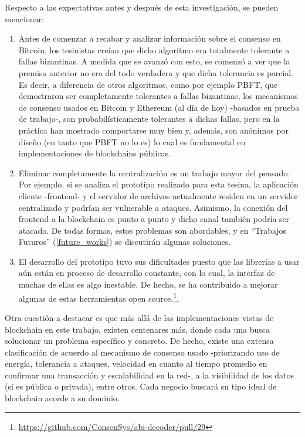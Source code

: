 Respecto a las expectativas antes y después de esta investigación, se pueden mencionar:

\begin{enumerate}
  \item Antes de comenzar a recabar y analizar información sobre el consenso en Bitcoin, los tesinistas creían que dicho algoritmo era totalmente tolerante a fallas bizantinas. A medida que se avanzó con esto, se comenzó a ver que la premisa anterior no era del todo verdadera y que dicha tolerancia es parcial. Es decir, a diferencia de otros algoritmos, como por ejemplo PBFT, que demostraron ser completamente tolerantes a fallas bizantinas, los mecanismos de consenso usados en Bitcoin y Ethereum (al día de hoy) -basados en prueba de trabajo-, son probabilísticamente tolerantes a dichas fallas, pero en la práctica han mostrado comportarse muy bien y, además, son anónimos por diseño (en tanto que PBFT no lo es) lo cual es fundamental en implementaciones de blockchains públicas.
  \item Eliminar completamente la centralización es un trabajo mayor del pensado. Por ejemplo, si se analiza el prototipo realizado para esta tesina, la aplicación cliente -frontend- y el servidor de archivos actualmente residen en un servidor centralizado y podrían ser vulnerable a ataques. Asimismo, la conexión del frontend a la blockchain es punto a punto y dicho canal también podría ser atacado. De todas formas, estos problemas son abordables, y en ``Trabajos Futuros'' (\ref{future_works}) se discutirán algunas soluciones.
  \item El desarrollo del prototipo tuvo sus dificultades puesto que las librerías a usar aún están en proceso de desarrollo constante, con lo cual, la interfaz de muchas de ellas es algo inestable. De hecho, se ha contribuido a mejorar algunas de estas herramientas open source.\footnote{\url{https://github.com/ConsenSys/abi-decoder/pull/29}}.
\end{enumerate}

Otra cuestión a destacar es que más allá de las implementaciones vistas de blockchain en este trabajo, existen centenares más, donde cada una busca solucionar un problema específico y concreto. De hecho, existe una extensa clasificación de acuerdo al mecanismo de consenso usado -priorizando uso de energía, tolerancia a ataques, velocidad en cuanto al tiempo promedio en confirmar una transacción y escalabilidad en la red-, a la visibilidad de los datos (si es pública o privada), entre otros. Cada negocio buscará su tipo ideal de blockchain acorde a su dominio.

